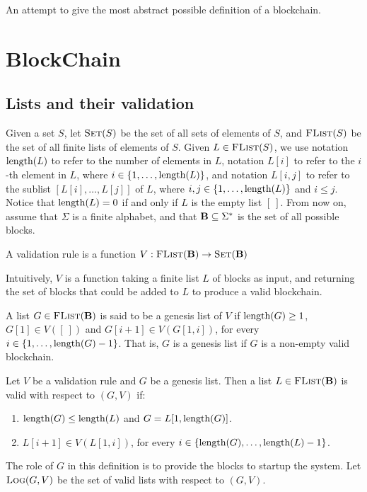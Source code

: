 
An attempt to give the most abstract possible definition of a blockchain.

\section{BlockChain}

\subsection{Lists and their validation}

Given a set $S$, let $\text{\sc Set}(S)$ be the set of all sets of elements of $S$, and $\text{\sc FList}(S)$ be the set of all finite lists of elements of $S$. Given $L \in \text{\sc FList}(S)$, we use notation $\text{\rm length}(L)$ to refer to the number of elements in $L$, notation $L[i]$ to refer to the $i$-th element in $L$, where $i \in \{1, \ldots, \text{\rm length}(L)\}$, and notation $L[i,j]$ to refer to the sublist $[L[i], \ldots, L[j]]$ of $L$, where $i,j \in \{1, \ldots, \text{\rm length}(L)\}$ and $i \leq j$. Notice that $\text{\rm length}(L) = 0$ if and only if $L$ is the empty list $[\ ]$. From now on, assume that $\Sigma$ is a finite alphabet, and that $\text{\bf B} \subseteq \Sigma^*$ is the set of all possible blocks.  

\begin{mydef}
A validation rule is a function $V : \text{\sc FList}(\text{\bf B}) \to \text{\sc Set}(\text{\bf B})$
\end{mydef}
Intuitively, $V$ is a function taking a finite list $L$ of blocks as input, and returning the set of blocks that could be added to $L$ to produce a valid blockchain.

A list $G \in \text{\sc FList}(\text{\bf B})$  is said to be a genesis list of $V$ if $\text{\rm length}(G) \geq 1$, $G[1] \in V([\ ])$ and $G[i+1] \in V(G[1,i])$, for every $i \in \{1, \ldots, \text{\rm length}(G)-1\}$. That is, $G$ is a genesis list if $G$ is a non-empty valid blockchain. 
\begin{mydef}
Let $V$ be a validation rule and $G$ be a genesis list. Then a list $L \in \text{\sc FList}(\text{\bf B})$ is valid with respect to $(G,V)$ if:
\begin{enumerate}
\item $\text{\rm length}(G) \leq \text{\rm length}(L)$ and $G = L[1,\text{\rm length}(G)]$.

\item $L[i+1] \in V(L[1,i])$, for every $i \in \{\text{\rm length}(G), \ldots, \text{\rm length}(L)-1\}$.
\end{enumerate}
\end{mydef}
The role of $G$ in this definition is to provide the blocks to startup the system. Let $\text{\sc Log}(G,V)$ be the set of valid lists with respect to $(G,V)$.

